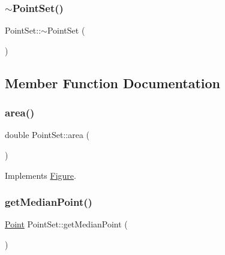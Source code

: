 \mbox{\label{class_point_set_a2ac2dc1fc77866357c8e1f1818019f61}} 
\subsubsection{\texorpdfstring{$\sim$\+Point\+Set()}{~PointSet()}}
{\footnotesize\ttfamily Point\+Set\+::$\sim$\+Point\+Set (\begin{DoxyParamCaption}{ }\end{DoxyParamCaption})\hspace{0.3cm}{\ttfamily [virtual]}}



\subsection{Member Function Documentation}
\mbox{\label{class_point_set_aca8092b860a40743fb1c1189e8439764}} 
\subsubsection{\texorpdfstring{area()}{area()}}
{\footnotesize\ttfamily double Point\+Set\+::area (\begin{DoxyParamCaption}{ }\end{DoxyParamCaption})\hspace{0.3cm}{\ttfamily [virtual]}}



Implements \hyperlink{class_figure_a9860bda67fc9ce8127a812e167c4ce75}{Figure}.

\mbox{\label{class_point_set_a61e0b486a1834af1158fecabaec4b4cb}} 
\subsubsection{\texorpdfstring{get\+Median\+Point()}{getMedianPoint()}}
{\footnotesize\ttfamily \hyperlink{class_point}{Point} Point\+Set\+::get\+Median\+Point (\begin{DoxyParamCaption}{ }\end{DoxyParamCaption})}

